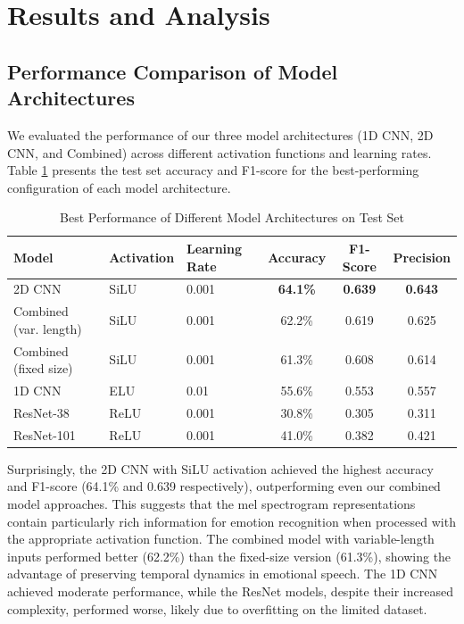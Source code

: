 \section{Results and Analysis}

\subsection{Performance Comparison of Model Architectures}

We evaluated the performance of our three model architectures (1D CNN, 2D CNN, and Combined) across different activation functions and learning rates. Table \ref{tab:overall_results} presents the test set accuracy and F1-score for the best-performing configuration of each model architecture.

\begin{table}[h]
\centering
\caption{Best Performance of Different Model Architectures on Test Set}
\label{tab:overall_results}
\begin{tabular}{@{}lllccc@{}}
\toprule
\textbf{Model} & \textbf{Activation} & \textbf{Learning Rate} & \textbf{Accuracy} & \textbf{F1-Score} & \textbf{Precision} \\
\midrule
2D CNN & SiLU & 0.001 & \textbf{64.1\%} & \textbf{0.639} & \textbf{0.643} \\
Combined (var. length) & SiLU & 0.001 & 62.2\% & 0.619 & 0.625 \\
Combined (fixed size) & SiLU & 0.001 & 61.3\% & 0.608 & 0.614 \\
1D CNN & ELU & 0.01 & 55.6\% & 0.553 & 0.557 \\
ResNet-38 & ReLU & 0.001 & 30.8\% & 0.305 & 0.311 \\
ResNet-101 & ReLU & 0.001 & 41.0\% & 0.382 & 0.421 \\
\bottomrule
\end{tabular}
\end{table}

Surprisingly, the 2D CNN with SiLU activation achieved the highest accuracy and F1-score (64.1\% and 0.639 respectively), outperforming even our combined model approaches. This suggests that the mel spectrogram representations contain particularly rich information for emotion recognition when processed with the appropriate activation function. The combined model with variable-length inputs performed better (62.2\%) than the fixed-size version (61.3\%), showing the advantage of preserving temporal dynamics in emotional speech. The 1D CNN achieved moderate performance, while the ResNet models, despite their increased complexity, performed worse, likely due to overfitting on the limited dataset.

